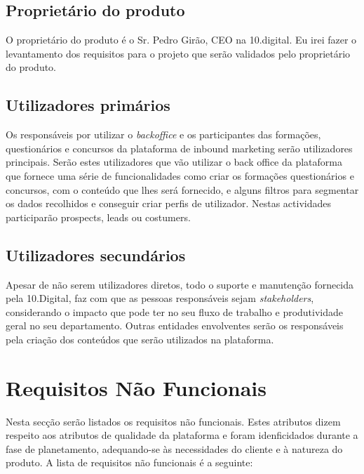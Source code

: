 \subsection{Proprietário do produto}

O proprietário do produto é o Sr. Pedro Girão, CEO na 10.digital. Eu irei fazer o levantamento dos requisitos para o projeto que serão validados pelo proprietário do produto.

\subsection{Utilizadores primários}

Os responsáveis por utilizar o \textit{backoffice} e os participantes das formações, questionários e concursos da plataforma de inbound marketing serão utilizadores principais. Serão estes utilizadores que vão utilizar o back office da plataforma que fornece uma série de funcionalidades como criar os formações questionários e concursos, com o conteúdo que lhes será fornecido, e alguns filtros para segmentar os dados recolhidos e conseguir criar perfis de utilizador. Nestas actividades participarão prospects, leads ou costumers.


\subsection{Utilizadores secundários}

Apesar de não serem utilizadores diretos, todo o suporte e manutenção fornecida pela 10.Digital, faz com que as pessoas responsáveis sejam \textit{stakeholders}, considerando o impacto que pode ter no seu fluxo de trabalho e produtividade geral no seu departamento. 
Outras entidades envolventes serão os responsáveis pela criação dos conteúdos que serão utilizados na plataforma.


\section{Requisitos Não Funcionais}
\label{rnf}

Nesta secção serão listados os requisitos não funcionais. Estes atributos dizem respeito aos atributos de qualidade da plataforma e foram idenficidados durante a fase de planetamento, adequando-se às necessidades do cliente e à natureza do produto. A lista de requisitos não funcionais é a seguinte:

